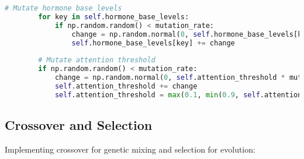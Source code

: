 \documentclass[11pt,a4paper]{article}
\begin{document}
\begin{lstlisting}[language=Python]
        # Mutate hormone base levels
        for key in self.hormone_base_levels:
            if np.random.random() < mutation_rate:
                change = np.random.normal(0, self.hormone_base_levels[key] * mutation_size)
                self.hormone_base_levels[key] += change
                
        # Mutate attention threshold
        if np.random.random() < mutation_rate:
            change = np.random.normal(0, self.attention_threshold * mutation_size)
            self.attention_threshold += change
            self.attention_threshold = max(0.1, min(0.9, self.attention_threshold))
\end{lstlisting}

\subsection{Crossover and Selection}
Implementing crossover for genetic mixing and selection for evolution:
\end{document}
